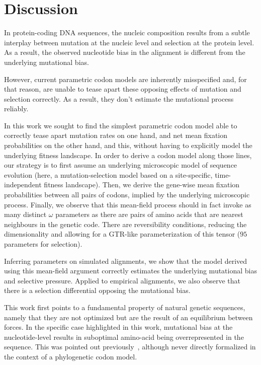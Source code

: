 \documentclass{article}
\begin{document}
\section{Discussion}\label{sec:discussion}

In protein-coding {DNA} sequences, the nucleic composition results from a subtle interplay between mutation at the nucleic level and selection at the protein level.
As a result, the observed nucleotide bias in the alignment is different from the underlying mutational bias.

However, current parametric codon models are inherently misspecified and, for that reason, are unable to tease apart these opposing effects of mutation and selection correctly.
As a result, they don’t estimate the mutational process reliably.

In this work we sought to find the simplest parametric codon model able to correctly tease apart mutation rates on one hand, and net mean fixation probabilities on the other hand, and this, without having to explicitly model the underlying fitness landscape.
In order to derive a codon model along those lines, our strategy is to first assume an underlying microscopic model of sequence evolution (here, a mutation-selection model based on a site-specific, time-independent fitness landscape).
Then, we derive the gene-wise mean fixation probabilities between all pairs of codons, implied by the underlying microscopic process.
Finally, we observe that this mean-field process should in fact invoke as many distinct $\omega$ parameters as there are pairs of amino acids that are nearest neighbours in the genetic code.
There are reversibility conditions, reducing the dimensionality and allowing for a GTR-like parameterization of this tensor ($95$ parameters for selection).

Inferring parameters on simulated alignments, we show that the model derived using this mean-field argument correctly estimates the underlying mutational bias and selective pressure.
Applied to empirical alignments, we also observe that there is a selection differential opposing the mutational bias.

This work first points to a fundamental property of natural genetic sequences, namely that they are not optimized but are the result of an equilibrium between forces.
In the specific case highlighted in this work, mutational bias at the nucleotide-level results in suboptimal amino-acid being overrepresented in the sequence.
This was pointed out previously~\citep{Singer2000}, although never directly formalized in the context of a phylogenetic codon model.
\end{document}
